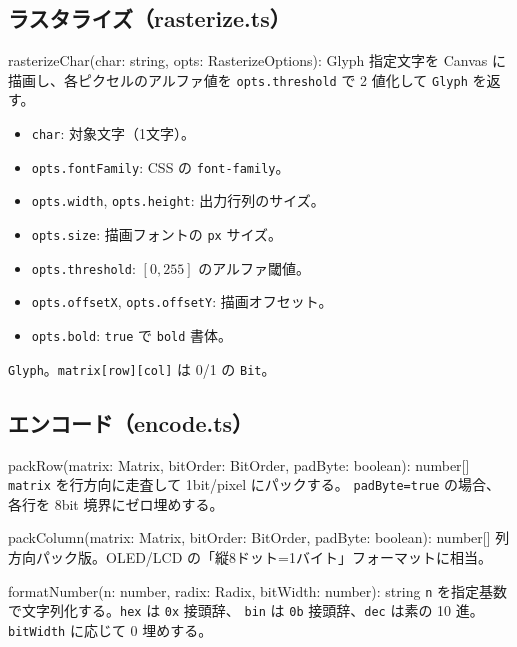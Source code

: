 \subsection{ラスタライズ（rasterize.ts）}

\begin{funcblock}{rasterizeChar(char: string, opts: RasterizeOptions): Glyph}
指定文字を Canvas に描画し、各ピクセルのアルファ値を
\texttt{opts.threshold} で 2 値化して \texttt{Glyph} を返す。

\begin{itemize}[leftmargin=*,itemsep=1pt]
  \item \texttt{char}: 対象文字（1文字）。
  \item \texttt{opts.fontFamily}: CSS の \texttt{font-family}。
  \item \texttt{opts.width}, \texttt{opts.height}: 出力行列のサイズ。
  \item \texttt{opts.size}: 描画フォントの \texttt{px} サイズ。
  \item \texttt{opts.threshold}: $[0,255]$ のアルファ閾値。
  \item \texttt{opts.offsetX}, \texttt{opts.offsetY}: 描画オフセット。
  \item \texttt{opts.bold}: \texttt{true} で \texttt{bold} 書体。
\end{itemize}

\texttt{Glyph}。\texttt{matrix[row][col]} は 0/1 の \texttt{Bit}。
\end{funcblock}

\subsection{エンコード（encode.ts）}

\begin{funcblock}{packRow(matrix: Matrix, bitOrder: BitOrder, padByte: boolean): number[]}
\texttt{matrix} を行方向に走査して 1bit/pixel にパックする。
\texttt{padByte=true} の場合、各行を 8bit 境界にゼロ埋めする。
\end{funcblock}

\begin{funcblock}{packColumn(matrix: Matrix, bitOrder: BitOrder, padByte: boolean): number[]}
列方向パック版。OLED/LCD の「縦8ドット=1バイト」フォーマットに相当。
\end{funcblock}

\begin{funcblock}{formatNumber(n: number, radix: Radix, bitWidth: number): string}
\texttt{n} を指定基数で文字列化する。\texttt{hex} は \texttt{0x} 接頭辞、
\texttt{bin} は \texttt{0b} 接頭辞、\texttt{dec} は素の 10 進。
\texttt{bitWidth} に応じて 0 埋めする。
\end{funcblock}

